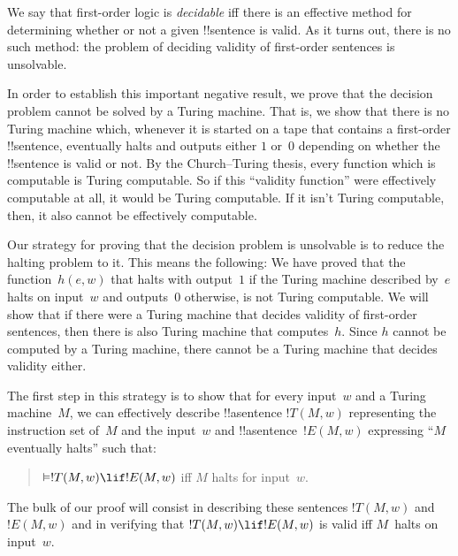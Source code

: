 \documentclass[../../../include/open-logic-section]{subfiles}
\begin{document}

We say that first-order logic is \emph{decidable} iff there is an
effective method for determining whether or not a given !!{sentence}
is valid. As it turns out, there is no such method: the problem of
deciding validity of first-order sentences is unsolvable.

In order to establish this important negative result, we prove that
the decision problem cannot be solved by a Turing machine.  That is,
we show that there is no Turing machine which, whenever it is started
on a tape that contains a first-order !!{sentence}, eventually halts
and outputs either $1$ or~$0$ depending on whether the
!!{sentence} is valid or not. By the Church--Turing thesis, every
function which is computable is Turing computable. So if this
``validity function'' were effectively computable at all, it would be
Turing computable. If it isn't Turing computable, then, it also cannot
be effectively computable.

Our strategy for proving that the decision problem is unsolvable is to
reduce the halting problem to it.  This means the following: We have
proved that the function~$h(e,w)$ that halts with output~$1$ if the
Turing machine described by~$e$ halts on input~$w$ and outputs~$0$
otherwise, is not Turing computable.  We will show that if there were
a Turing machine that decides validity of first-order sentences, then
there is also Turing machine that computes~$h$.  Since $h$ cannot be
computed by a Turing machine, there cannot be a Turing machine that
decides validity either.

The first step in this strategy is to show that for every input~$w$
and a Turing machine~$M$, we can effectively describe !!a{sentence}
$!T(M, w)$ representing the instruction set of~$M$ and the input~$w$
and !!a{sentence}~$!E(M, w)$ expressing ``$M$ eventually halts'' such
that:
\begin{quote}
  $\Entails !T(M, w) \lif !E(M,w)$ iff $M$ halts for input~$w$.
\end{quote}
The bulk of our proof will consist in describing these sentences
$!T(M, w)$ and~$!E(M, w)$ and in verifying that $!T(M, w) \lif !E(M, w)$
is valid iff $M$~halts on input~$w$.
\end{document}
